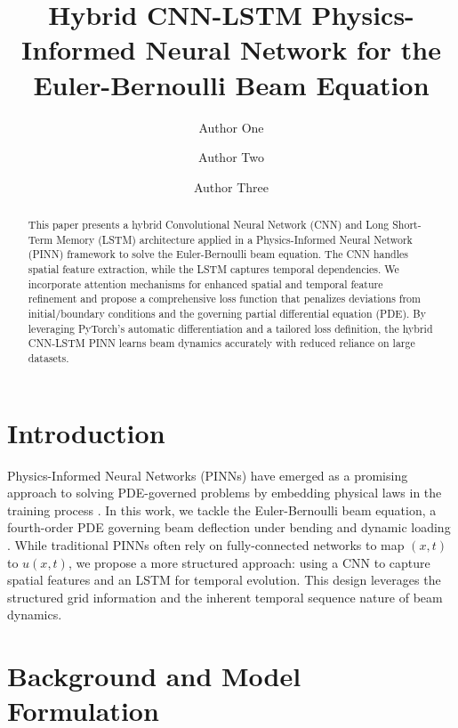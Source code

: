 \documentclass[Journal,letterpaper]{ascelike-new}
\begin{document}
\title{Hybrid CNN-LSTM Physics-Informed Neural Network for the Euler-Bernoulli Beam Equation}

\author[1]{Author One}
\author[2]{Author Two}
\author[3]{Author Three}


\maketitle

\begin{abstract}
This paper presents a hybrid Convolutional Neural Network (CNN) and Long Short-Term Memory (LSTM) architecture applied in a Physics-Informed Neural Network (PINN) framework to solve the Euler-Bernoulli beam equation. The CNN handles spatial feature extraction, while the LSTM captures temporal dependencies. We incorporate attention mechanisms for enhanced spatial and temporal feature refinement and propose a comprehensive loss function that penalizes deviations from initial/boundary conditions and the governing partial differential equation (PDE). By leveraging PyTorch's automatic differentiation and a tailored loss definition, the hybrid CNN-LSTM PINN learns beam dynamics accurately with reduced reliance on large datasets.
\end{abstract}

\section{Introduction}
Physics-Informed Neural Networks (PINNs) have emerged as a promising approach to solving PDE-governed problems by embedding physical laws in the training process \cite{raissi2019physics,karniadakis2021physics}. In this work, we tackle the Euler-Bernoulli beam equation, a fourth-order PDE governing beam deflection under bending and dynamic loading \cite{timoshenko1959theory}. While traditional PINNs often rely on fully-connected networks to map $(x,t)$ to $u(x,t)$, we propose a more structured approach: using a CNN to capture spatial features and an LSTM for temporal evolution. This design leverages the structured grid information and the inherent temporal sequence nature of beam dynamics.

\section{Background and Model Formulation}
\end{document}
